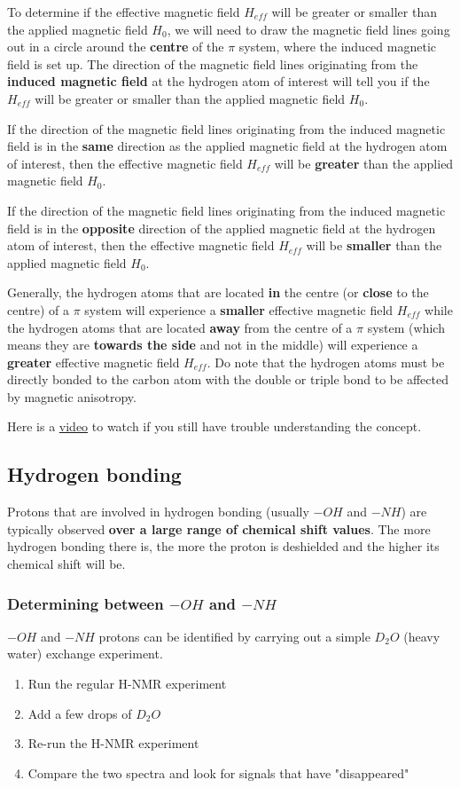 \documentclass[11pt]{article}
\begin{document}
To determine if the effective magnetic field \(H_{eff}\) will be greater or smaller than the applied magnetic field \(H_{0}\), we will need to draw the magnetic field lines going out in a circle around the \textbf{centre} of the \(\pi\) system, where the induced magnetic field is set up. The direction of the magnetic field lines originating from the \textbf{induced magnetic field} at the hydrogen atom of interest will tell you if the \(H_{eff}\) will be greater or smaller than the applied magnetic field \(H_{0}\).


If the direction of the magnetic field lines originating from the induced magnetic field is in the \textbf{same} direction as the applied magnetic field at the hydrogen atom of interest, then the effective magnetic field \(H_{eff}\) will be \textbf{greater} than the applied magnetic field \(H_{0}\).


If the direction of the magnetic field lines originating from the induced magnetic field is in the \textbf{opposite} direction of the applied magnetic field at the hydrogen atom of interest, then the effective magnetic field \(H_{eff}\) will be \textbf{smaller} than the applied magnetic field \(H_{0}\).


Generally, the hydrogen atoms that are located \textbf{in} the centre (or \textbf{close} to the centre) of a \(\pi\) system will experience a \textbf{smaller} effective magnetic field \(H_{eff}\) while the hydrogen atoms that are located \textbf{away} from the centre of a \(\pi\) system (which means they are \textbf{towards the side} and not in the middle) will experience a \textbf{greater} effective magnetic field \(H_{eff}\). Do note that the hydrogen atoms must be directly bonded to the carbon atom with the double or triple bond to be affected by magnetic anisotropy.


Here is a \href{https://youtu.be/w8ew5bvdrqg}{video} to watch if you still have trouble understanding the concept.

\newpage
\subsection{Hydrogen bonding}
\label{sec:orga9e2aa7}
Protons that are involved in hydrogen bonding (usually \(-OH\) and \(-NH\)) are typically observed \textbf{over a large range of chemical shift values}. The more hydrogen bonding there is, the more the proton is deshielded and the higher its chemical shift will be.
\subsubsection{Determining between \(-OH\) and \(-NH\)}
\label{sec:orgdb3f764}
\(-OH\) and \(-NH\) protons can be identified by carrying out a simple \(D_2O\) (heavy water) exchange experiment.
\begin{enumerate}
\item Run the regular H-NMR experiment
\item Add a few drops of \(D_2O\)
\item Re-run the H-NMR experiment
\item Compare the two spectra and look for signals that have "disappeared"
\end{enumerate}
\end{document}
